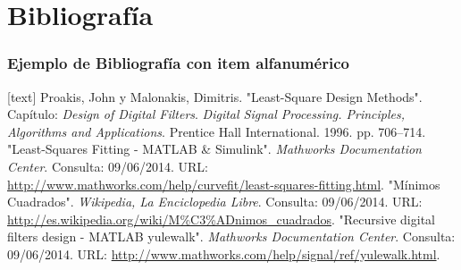 \documentclass[spanish,xcolor=dvipsnames]{beamer}
\begin{document}
    \section{Bibliografía}
    \begin{frame}
        \frametitle{Ejemplo de Bibliografía con item alfanumérico}
        \begin{thebibliography}{9}\small
            [text]
             Proakis, John y Malonakis, Dimitris. "Least-Square Design Methods". Capítulo: \emph{Design of Digital Filters}. \emph{Digital Signal Processing. Principles, Algorithms and Applications}. Prentice Hall International. 1996. pp. 706--714.
             "Least-Squares Fitting - MATLAB \& Simulink". \emph{Mathworks Documentation Center}. Consulta: 09/06/2014. URL: \url{http://www.mathworks.com/help/curvefit/least-squares-fitting.html}.
             "Mínimos Cuadrados". \emph{Wikipedia, La Enciclopedia Libre}. Consulta: 09/06/2014. URL: \url{http://es.wikipedia.org/wiki/M\%C3\%ADnimos_cuadrados}.
             "Recursive digital filters design - MATLAB yulewalk". \emph{Mathworks Documentation Center}. Consulta: 09/06/2014. URL: \url{http://www.mathworks.com/help/signal/ref/yulewalk.html}.
        \end{thebibliography}
    \end{frame}
\end{document}
